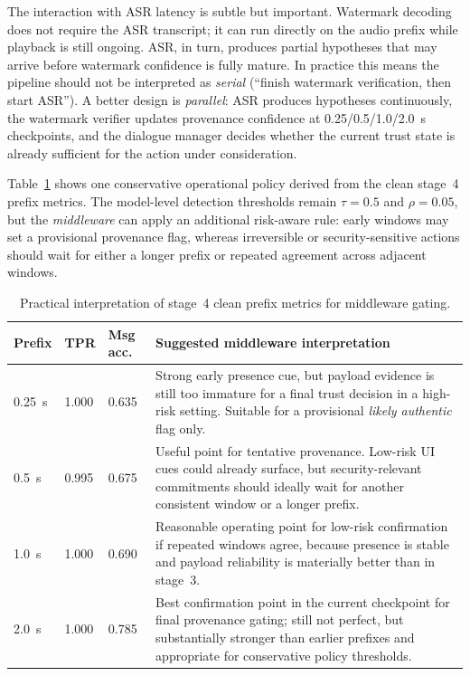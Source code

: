 The interaction with ASR latency is subtle but important. Watermark decoding does not require the ASR transcript; it can run directly on the audio prefix while playback is still ongoing. ASR, in turn, produces partial hypotheses that may arrive before watermark confidence is fully mature. In practice this means the pipeline should not be interpreted as \emph{serial} (``finish watermark verification, then start ASR''). A better design is \emph{parallel}: ASR produces hypotheses continuously, the watermark verifier updates provenance confidence at 0.25/0.5/1.0/2.0~s checkpoints, and the dialogue manager decides whether the current trust state is already sufficient for the action under consideration.

Table~\ref{tab:prefix_policy} shows one conservative operational policy derived from the clean stage~4 prefix metrics. The model-level detection thresholds remain $\tau=0.5$ and $\rho=0.05$, but the \emph{middleware} can apply an additional risk-aware rule: early windows may set a provisional provenance flag, whereas irreversible or security-sensitive actions should wait for either a longer prefix or repeated agreement across adjacent windows.

\begin{table}[H]
\centering
\caption{Practical interpretation of stage~4 clean prefix metrics for middleware gating.}
\label{tab:prefix_policy}
\begin{tabular}{p{1.8cm}p{1.6cm}p{2.0cm}p{8.0cm}}
\toprule
\textbf{Prefix} & \textbf{TPR} & \textbf{Msg acc.} & \textbf{Suggested middleware interpretation} \\
\midrule
0.25~s & 1.000 & 0.635 & Strong early presence cue, but payload evidence is still too immature for a final trust decision in a high-risk setting. Suitable for a provisional \emph{likely authentic} flag only. \\
0.5~s & 0.995 & 0.675 & Useful point for tentative provenance. Low-risk UI cues could already surface, but security-relevant commitments should ideally wait for another consistent window or a longer prefix. \\
1.0~s & 1.000 & 0.690 & Reasonable operating point for low-risk confirmation if repeated windows agree, because presence is stable and payload reliability is materially better than in stage~3. \\
2.0~s & 1.000 & 0.785 & Best confirmation point in the current checkpoint for final provenance gating; still not perfect, but substantially stronger than earlier prefixes and appropriate for conservative policy thresholds. \\
\bottomrule
\end{tabular}
\end{table}

